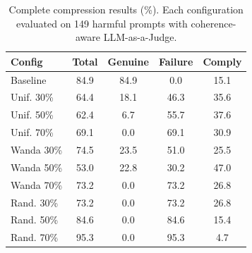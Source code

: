 \documentclass[11pt]{article}
\begin{document}
\begin{table}[t]
\centering
\small
\begin{tabular}{@{}lcccc@{}}
\toprule
\textbf{Config} & \textbf{Total} & \textbf{Genuine} & \textbf{Failure} & \textbf{Comply} \\
\midrule
Baseline & 84.9 & 84.9 & 0.0 & 15.1 \\
\midrule
Unif. 30\% & 64.4 & 18.1 & 46.3 & 35.6 \\
Unif. 50\% & 62.4 & 6.7 & 55.7 & 37.6 \\
Unif. 70\% & 69.1 & 0.0 & 69.1 & 30.9 \\
\midrule
Wanda 30\% & 74.5 & 23.5 & 51.0 & 25.5 \\
Wanda 50\% & 53.0 & 22.8 & 30.2 & 47.0 \\
Wanda 70\% & 73.2 & 0.0 & 73.2 & 26.8 \\
\midrule
Rand. 30\% & 73.2 & 0.0 & 73.2 & 26.8 \\
Rand. 50\% & 84.6 & 0.0 & 84.6 & 15.4 \\
Rand. 70\% & 95.3 & 0.0 & 95.3 & 4.7 \\
\bottomrule
\end{tabular}
\caption{Complete compression results (\%). Each configuration evaluated on 149 harmful prompts with coherence-aware LLM-as-a-Judge.}
\label{tab:full_compression}
\end{table}
\end{document}
